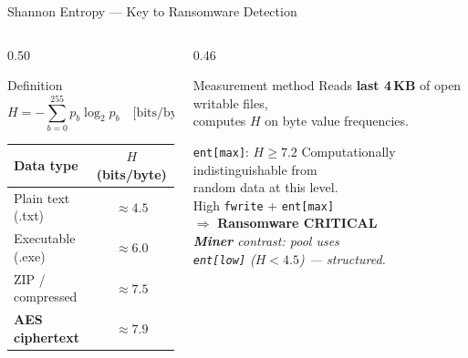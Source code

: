 \documentclass[aspectratio=169,12pt]{beamer}
\newcommand{\R}[1]{\textcolor{accent-r}{\textbf{#1}}}
\newcommand{\C}[1]{\textcolor{accent-c}{\textbf{#1}}}
\begin{document}
\begin{frame}{Shannon Entropy — Key to Ransomware Detection}
  \begin{columns}[T]
    \begin{column}{0.50\textwidth}
      \begin{block}{Definition}
        \[
          H = -\sum_{b=0}^{255} p_b \log_2 p_b \quad \text{[bits/byte]}
        \]
      \end{block}
      \vspace{0.4em}
      \small
      \setlength{\tabcolsep}{5pt}
      \renewcommand{\arraystretch}{1.2}
      \begin{tabular}{@{} l c @{}}
        \toprule
        \textbf{Data type} & $H$ (bits/byte) \\
        \midrule
        Plain text (.txt)      & $\approx 4.5$ \\
        Executable (.exe)      & $\approx 6.0$ \\
        ZIP / compressed       & $\approx 7.5$ \\
        \R{AES ciphertext}     & $\approx \mathbf{7.9}$ \\
        \bottomrule
      \end{tabular}
    \end{column}
    \begin{column}{0.46\textwidth}
      \begin{exampleblock}{Measurement method}
        \small Reads \textbf{last 4\,KB} of open writable files,\\
        computes $H$ on byte value frequencies.
      \end{exampleblock}
      \vspace{0.35em}
      \begin{alertblock}{\texttt{ent[max]}: $H \geq 7.2$}
        \small
        Computationally indistinguishable from\\
        random data at this level.\\[0.25em]
        High \texttt{fwrite} + \texttt{ent[max]}\\
        $\Rightarrow$ \R{Ransomware CRITICAL}\\[0.25em]
        \textit{\C{Miner} contrast: pool uses\\
        \texttt{ent[low]} ($H<4.5$) — structured.}
      \end{alertblock}
    \end{column}
  \end{columns}
\end{frame}
\end{document}
